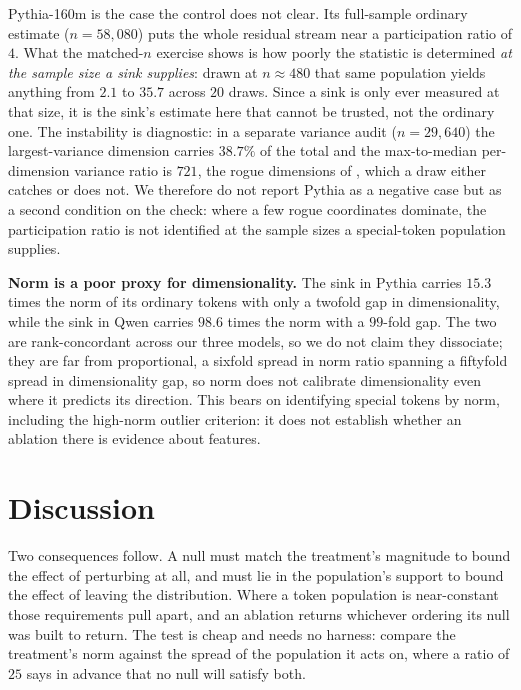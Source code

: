 \documentclass{article}
\begin{document}
Pythia-160m is the case the control does not clear. Its full-sample ordinary estimate ($n=58{,}080$) puts the whole residual stream near a participation ratio of $4$. What the matched-$n$ exercise shows is how poorly the statistic is determined \emph{at the sample size a sink supplies}: drawn at $n\approx480$ that same population yields anything from $2.1$ to $35.7$ across $20$ draws. Since a sink is only ever measured at that size, it is the sink's estimate here that cannot be trusted, not the ordinary one. The instability is diagnostic: in a separate variance audit ($n=29{,}640$) the largest-variance dimension carries $38.7\%$ of the total and the max-to-median per-dimension variance ratio is $721$, the rogue dimensions of \citet{timkey2021bark}, which a draw either catches or does not. We therefore do not report Pythia as a negative case but as a second condition on the check: where a few rogue coordinates dominate, the participation ratio is not identified at the sample sizes a special-token population supplies.

\textbf{Norm is a poor proxy for dimensionality.} The sink in Pythia carries $15.3$ times the norm of its ordinary tokens with only a twofold gap in dimensionality, while the sink in Qwen carries $98.6$ times the norm with a $99$-fold gap. The two are rank-concordant across our three models, so we do not claim they dissociate; they are far from proportional, a sixfold spread in norm ratio spanning a fiftyfold spread in dimensionality gap, so norm does not calibrate dimensionality even where it predicts its direction. This bears on identifying special tokens by norm, including the high-norm outlier criterion: it does not establish whether an ablation there is evidence about features.

\section{Discussion}

Two consequences follow. A null must match the treatment's magnitude to bound the effect of perturbing at all, and must lie in the population's support to bound the effect of leaving the distribution. Where a token population is near-constant those requirements pull apart, and an ablation returns whichever ordering its null was built to return. The test is cheap and needs no harness: compare the treatment's norm against the spread of the population it acts on, where a ratio of $25$ says in advance that no null will satisfy both.
\end{document}
